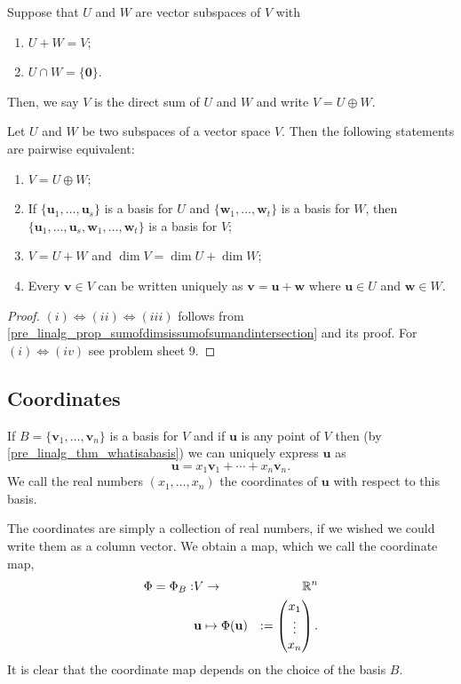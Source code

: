 \documentclass[10pt, a4paper]{article}
\newcommand{\mbf}[1]{\mathbf{#1}}
\begin{document}
\begin{definition}
    Suppose that $U$ and $W$ are vector subspaces of $V$ with
    \begin{enumerate}[label = (\roman*)]
        \item $U + W = V$;
        \item $U \cap W = \{\mbf{0}\}$.
    \end{enumerate}
    Then,
    we say $V$ is the direct sum of $U$ and $W$ and write $V = U \oplus W$.
\end{definition}

\begin{proposition}
    Let $U$ and $W$ be two subspaces of a vector space $V$.
    Then the following statements are pairwise equivalent:
    \begin{enumerate}[label = (\roman*)]
        \item $V = U \oplus W$;
        \item If $\{\mbf{u}_1, \dotsc, \mbf{u}_s\}$ is a basis for $U$ and $\{\mbf{w}_1, \dotsc, \mbf{w}_t\}$ is a basis for $W$,
        then $\{\mbf{u}_1, \dotsc, \mbf{u}_s, \mbf{w}_1, \dotsc, \mbf{w}_t\}$ is a basis for $V$;
        \item $V = U + W$ and $\dim{V} = \dim{U} + \dim{W}$;
        \item Every $\mbf{v} \in V$ can be written uniquely as $\mbf{v} = \mbf{u} + \mbf{w}$ where $\mbf{u} \in U$ and $\mbf{w} \in W$.
    \end{enumerate}
    \begin{proof}
        $(i) \iff (ii) \iff (iii)$ follows from \autoref{pre_linalg_prop_sumofdimsissumofsumandintersection} and its proof.
        For $(i) \iff (iv)$ see problem sheet $9$.
    \end{proof}
\end{proposition}

\subsection{Coordinates}
If $B = \{\mbf{v}_1, \dotsc, \mbf{v}_n\}$ is a basis for $V$ and if $\mbf{u}$ is any point of $V$ then
(by \autoref{pre_linalg_thm_whatisabasis})
we can uniquely express $\mbf{u}$ as
\[
\mbf{u} = x_1\mbf{v}_1 + \dotsi + x_n\mbf{v}_n.
\]
We call the real numbers $(x_1, \dotsc, x_n)$ the coordinates of $\mbf{u}$ with respect to this basis.

The coordinates are simply a collection of real numbers,
if we wished we could write them as a column vector.
We obtain a map,
which we call the coordinate map,
\begin{align*}
    \Phi = \Phi_B : &V \rightarrow &\R ^ n \\
    &\mbf{u} \mapsto \Phi(\mbf{u}) &:=\begin{pmatrix}
        x_1 \\ \vdots \\ x_n
    \end{pmatrix}.
\end{align*}
It is clear that the coordinate map depends on the choice of the basis $B$.
\end{document}
